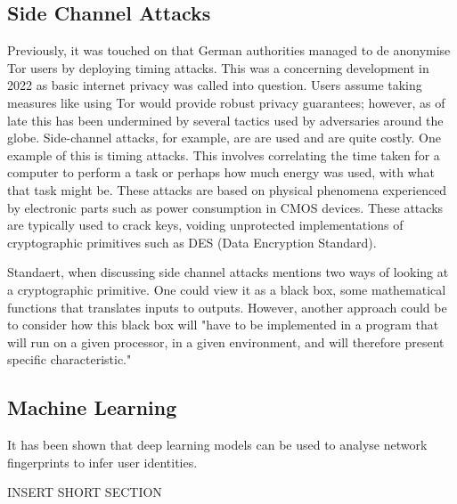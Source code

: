 \subsection{Side Channel Attacks}
Previously, it was touched on that German authorities managed to de anonymise Tor users by deploying timing attacks. This was a concerning development in 2022 as basic internet privacy was called into question. Users assume taking measures like using Tor would provide robust privacy guarantees; however, as of late this has been undermined by several tactics used by adversaries around the globe. Side-channel attacks, for example, are are used and are quite costly. One example of this is timing attacks. This involves correlating the time taken for a computer to perform a task or perhaps how much energy was used, with what that task might be. These attacks are based on physical phenomena experienced by electronic parts such as power consumption in CMOS devices. These attacks are typically used to crack keys, voiding unprotected implementations of cryptographic primitives such as DES (Data Encryption Standard).

Standaert, when discussing side channel attacks mentions two ways of looking at a cryptographic primitive. One could view it as a black box, some mathematical functions that translates inputs to outputs. However, another approach could be to consider how this black box will "have to be implemented in a program that will run on a given processor, in a given environment, and will therefore present specific characteristic." \cite{standaert2005introduction} 
 
 
\subsection{Machine Learning}
It has been shown that deep learning models can be used to analyse network fingerprints to infer user identities.

INSERT SHORT SECTION

